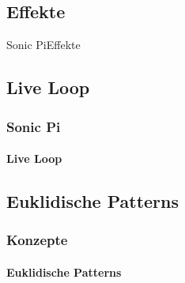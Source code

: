\documentclass{beamer}
\begin{document}
\subsection{Effekte}
\begin{frame}[fragile]{Sonic Pi}{Effekte}
\end{frame}

\subsection{Live Loop}
\begin{frame}
  \frametitle{Sonic Pi}
  \framesubtitle{Live Loop}
\end{frame}

\subsection{Euklidische Patterns}
\begin{frame}
  \frametitle{Konzepte}
  \framesubtitle{Euklidische Patterns}
\end{frame}
\end{document}
